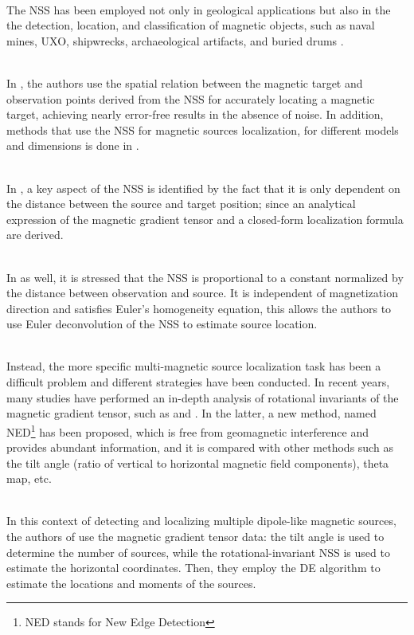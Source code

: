 \documentclass[main]{subfiles}
\begin{document}
\noindent\\The NSS has been employed not only in geological applications but also in the  
the detection, location, and classification of magnetic objects, such as naval 
mines, UXO, shipwrecks, archaeological artifacts, and buried drums \cite{NSS_analysis2}.

\noindent\\In \cite{NSS_formula_important}, the authors use the spatial relation between the 
magnetic target and observation points derived from the NSS for accurately locating 
a magnetic target, achieving nearly error-free results in the absence of noise.
In addition, methods that use the NSS for magnetic sources localization, for different models
and dimensions is done in \cite{NSS_single_different_dimensions}. 

\noindent\\
In \cite{NSS_single_localization}, a key aspect of the NSS is identified by the fact
that it is only dependent on the distance between the source and target position;
since an analytical expression of the magnetic gradient tensor and a closed-form 
localization formula are derived.

\noindent\\
In \cite{NSS_analysis} as well, it is stressed that the NSS is proportional 
to a constant normalized by the distance between observation and source. 
It is independent of magnetization direction and satisfies Euler’s homogeneity equation, 
this allows the authors to use Euler deconvolution of the NSS to estimate source location.  

\noindent\\
Instead, the more specific multi-magnetic source localization task 
has been a difficult problem and different strategies have been conducted.
\noindent
In recent years, many studies have performed an in-depth analysis of rotational 
invariants of the magnetic gradient tensor, such as \cite{multiple_plots} and 
\cite{multiple_real_plots_invariants}.
In the latter, a new method, named NED\footnote{NED stands for New Edge Detection} 
has been proposed, which is free from geomagnetic interference and provides 
abundant information, and it is compared with other methods such as the tilt angle 
(ratio of vertical to horizontal magnetic field components),
theta map, etc.

\noindent\\
In this context of detecting and localizing multiple dipole-like 
magnetic sources, the authors of \cite{multiple_DE_NSS_big_matrix} 
use the magnetic gradient tensor data:
the tilt angle is used to determine the number of sources, 
while the rotational-invariant NSS is used to estimate the horizontal coordinates. 
Then, they employ the DE algorithm to estimate the locations and moments of the sources.
\end{document}
